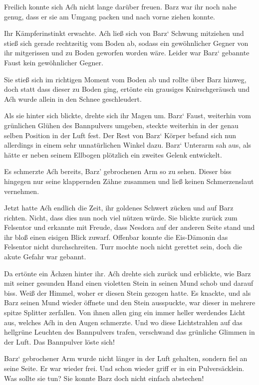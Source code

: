 Freilich konnte sich Aćh nicht lange darüber freuen. Barz war ihr noch nahe genug, dass er sie am Umgang packen und nach vorne ziehen konnte.

Ihr Kämpferinstinkt erwachte. Aćh ließ sich von Barz‘ Schwung mitziehen und stieß sich gerade rechtzeitig vom Boden ab, sodass ein gewöhnlicher Gegner von ihr mitgerissen und zu Boden geworfen worden wäre. Leider war Barz‘ gebannte Faust kein gewöhnlicher Gegner.

Sie stieß sich im richtigen Moment vom Boden ab und rollte über Barz hinweg, doch statt dass dieser zu Boden ging, ertönte ein grausiges Knirschgeräusch und Aćh wurde allein in den Schnee geschleudert.

Als sie hinter sich blickte, drehte sich ihr Magen um. Barz‘ Faust, weiterhin vom grünlichen Glühen des Bannpulvers umgeben, steckte weiterhin in der genau selben Position in der Luft fest. Der Rest von Barz‘ Körper befand sich nun allerdings in einem sehr unnatürlichen Winkel dazu. Barz‘ Unterarm sah aus, als hätte er neben seinem Ellbogen plötzlich ein zweites Gelenk entwickelt.

Es schmerzte Aćh bereits, Barz’ gebrochenen Arm so zu sehen. Dieser biss hingegen nur seine klappernden Zähne zusammen und ließ keinen Schmerzenslaut vernehmen.

Jetzt hatte Aćh endlich die Zeit, ihr goldenes Schwert zücken und auf Barz richten. Nicht, dass dies nun noch viel nützen würde. Sie blickte zurück zum Felsentor und erkannte mit Freude, dass Nesdora auf der anderen Seite stand und ihr bloß einen eisigen Blick zuwarf. Offenbar konnte die Eis-Dämonin das Felsentor nicht durchschreiten. Turr mochte noch nicht gerettet sein, doch die akute Gefahr war gebannt.

Da ertönte ein Ächzen hinter ihr. Aćh drehte sich zurück und erblickte, wie Barz mit seiner gesunden Hand einen violetten Stein in seinen Mund schob und darauf biss. Weiß der Himmel, woher er diesen Stein gezogen hatte. Es knackte, und als Barz seinen Mund wieder öffnete und den Stein ausspuckte, war dieser in mehrere spitze Splitter zerfallen. Von ihnen allen ging ein immer heller werdendes Licht aus, welches Aćh in den Augen schmerzte. Und wo diese Lichtstrahlen auf das hellgrüne Leuchten des Bannpulvers trafen, verschwand das grünliche Glimmen in der Luft. Das Bannpulver löste sich!

Barz‘ gebrochener Arm wurde nicht länger in der Luft gehalten, sondern fiel an seine Seite. Er war wieder frei. Und schon wieder griff er in ein Pulversäcklein. Was sollte sie tun? Sie konnte Barz doch nicht einfach abstechen!

